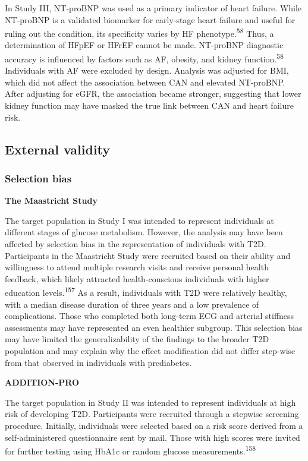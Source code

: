 \documentclass[
  a4paper,
  headsepline=true,
  open=any]{scrbook}
\begin{document}
In Study III, NT-proBNP was used as a primary indicator of heart
failure. While NT-proBNP is a validated biomarker for early-stage heart
failure and useful for ruling out the condition, its specificity varies
by HF phenotype.\textsuperscript{58} Thus, a determination of HFpEF or
HFrEF cannot be made. NT-proBNP diagnostic accuracy is influenced by
factors such as AF, obesity, and kidney function.\textsuperscript{58}
Individuals with AF were excluded by design. Analysis was adjusted for
BMI, which did not affect the association between CAN and elevated
NT-proBNP. After adjusting for eGFR, the association became stronger,
suggesting that lower kidney function may have masked the true link
between CAN and heart failure risk.

\hypertarget{external-validity}{%
\subsection{External validity}\label{external-validity}}

\hypertarget{selection-bias}{%
\subsubsection{Selection bias}\label{selection-bias}}

\textbf{The Maastricht Study}

The target population in Study I was intended to represent individuals
at different stages of glucose metabolism. However, the analysis may
have been affected by selection bias in the representation of
individuals with T2D. Participants in the Maastricht Study were
recruited based on their ability and willingness to attend multiple
research visits and receive personal health feedback, which likely
attracted health-conscious individuals with higher education
levels.\textsuperscript{157} As a result, individuals with T2D were
relatively healthy, with a median disease duration of three years and a
low prevalence of complications. Those who completed both long-term ECG
and arterial stiffness assessments may have represented an even
healthier subgroup. This selection bias may have limited the
generalizability of the findings to the broader T2D population and may
explain why the effect modification did not differ step-wise from that
observed in individuals with prediabetes.

\textbf{ADDITION-PRO}

The target population in Study II was intended to represent individuals
at high risk of developing T2D. Participants were recruited through a
stepwise screening procedure. Initially, individuals were selected based
on a risk score derived from a self-administered questionnaire sent by
mail. Those with high scores were invited for further testing using
HbA1c or random glucose measurements.\textsuperscript{158}
\end{document}
